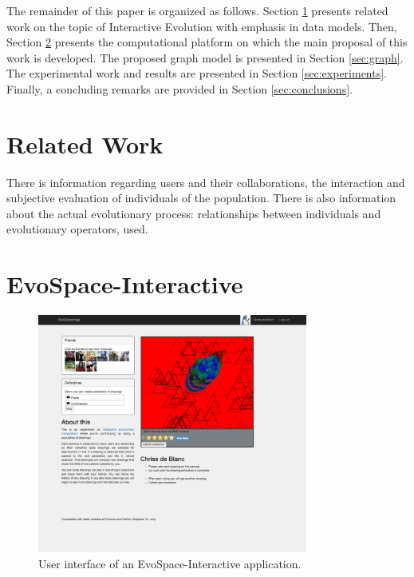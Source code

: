\documentclass[conference]{IEEEtran}
\begin{document}
The remainder of this paper is organized as follows.
Section \ref{sec:interactive} presents related work on the topic 
of Interactive Evolution with emphasis in data models.
Then, Section \ref{sec:evospace-i} presents the computational platform on which 
the main proposal of this work is developed. The proposed graph model is 
presented in Section \ref{sec:graph}.
The experimental work and results are presented in Section \ref{sec:experiments}.
Finally, a concluding remarks are provided in Section \ref{sec:conclusions}.


\section{Related Work}
\label{sec:interactive}




There is information regarding users and their collaborations, the interaction and subjective evaluation of individuals of the population. There is also information about the actual evolutionary process: relationships between individuals and evolutionary operators, used. 




\section{EvoSpace-Interactive}
\label{sec:evospace-i}
\begin{figure}[!t]
    \centering
        \includegraphics[width=3.5in]{img/UI_ed01.png}
    \caption{User interface of an EvoSpace-Interactive application.}
    \label{fig:web}
\end{figure}
\end{document}
